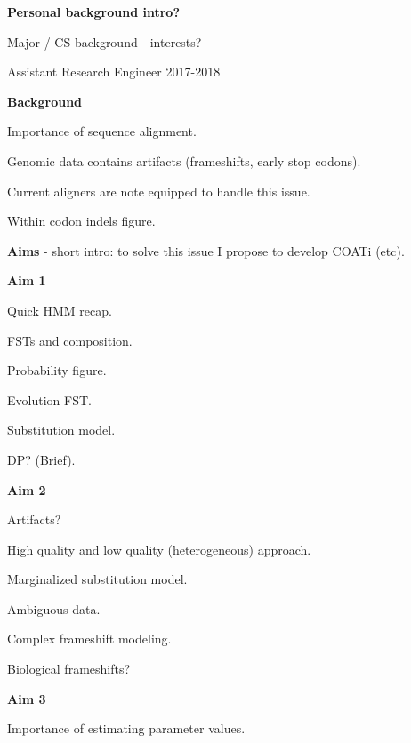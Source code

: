 
\usepackage{outline}


\begin{outline}
	\item \textbf{Personal background intro?}  %
	\begin{outline}
		\item Major / CS background - interests?
		\item Assistant Research Engineer 2017-2018
	\end{outline}
	\item \textbf{Background}
	\begin{outline}
		\item Importance of sequence alignment.
		\item Genomic data contains artifacts (frameshifts, early stop codons).
		\item Current aligners are note equipped to handle this issue.
		\item Within codon indels figure.
	\end{outline}
	\item \textbf{Aims} - short intro: to solve this issue I propose to develop
				COATi (etc).
	\item \textbf{Aim 1}
	\begin{outline}
		\item Quick HMM recap.
		\item FSTs and composition.
		\item Probability figure.
		\item Evolution FST.
		\item Substitution model.
		\item DP? (Brief).
	\end{outline}
	\item \textbf{Aim 2}
	\begin{outline}
		\item Artifacts?
		\item High quality and low quality (heterogeneous) approach.
		\item Marginalized substitution model.
		\item Ambiguous data.
		\item Complex frameshift modeling.
		\item Biological frameshifts?
	\end{outline}
	\item \textbf{Aim 3}
	\begin{outline}
		\item Importance of estimating parameter values.

\end{outline}
\end{outline}
